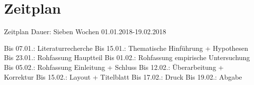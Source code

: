 \section{Zeitplan}
\label{sec:zeitplan}

Zeitplan
Dauer: Sieben Wochen
01.01.2018-19.02.2018

Bis 07.01.: Literaturrecherche
Bis 15.01.: Thematische Hinführung + Hypothesen
Bis 23.01.: Rohfassung Hauptteil
Bis 01.02.: Rohfassung empirische Untersuchung
Bis 05.02.: Rohfassung Einleitung + Schluss
Bis 12.02.: Überarbeitung + Korrektur
Bis 15.02.: Layout + Titelblatt
Bis 17.02.: Druck
Bis 19.02.: Abgabe